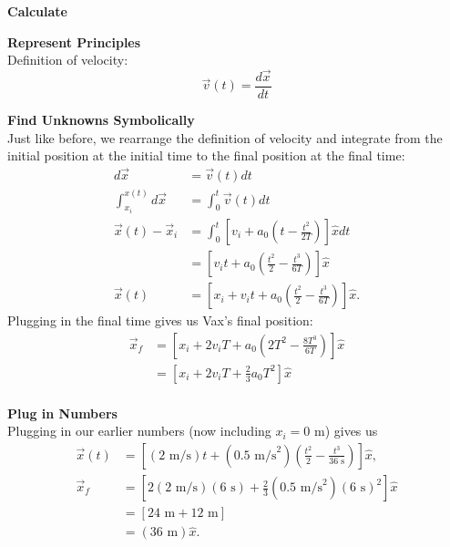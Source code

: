 \documentclass[]{article}
\begin{document}
\newpage
\begin{TeacherMargin}
\noindent\textbf{Calculate}

\noindent\textbf{Represent Principles} \\
Definition of velocity:
\[
\vec{v}(t) = \frac{d\vec{x}}{dt}
\]

\noindent\textbf{Find Unknowns Symbolically} \\
Just like before, we rearrange the definition of velocity and integrate from the initial position at the initial time to the final position at the final time:
\[
\begin{split}
	d\vec{x} & = \vec{v}(t) dt \\
	\int_{x_{i}}^{x(t)}d\vec{x} & = \int_{0}^{t}\vec{v}(t) dt \\
	\vec{x}(t) - \vec{x}_{i} & = \int_{0}^{t}\left[v_{i} + a_{0}\left(t-\frac{t^{2}}{2T}\right)\right]\hat{x} dt \\
	& = \left[v_{i}t + a_{0}\left(\frac{t^{2}}{2}-\frac{t^{3}}{6T}\right)\right]\hat{x} \\
	\vec{x}(t) & = \left[x_{i} + v_{i}t + a_{0}\left(\frac{t^{2}}{2}-\frac{t^{3}}{6T}\right)\right]\hat{x}.
\end{split}
\]
Plugging in the final time gives us Vax's final position:
\[
\begin{split}
	\vec{x}_{f} & = \left[x_{i} + 2v_{i}T + a_{0}\left(2T^{2}-\frac{8T^{3}}{6T}\right)\right]\hat{x} \\
	& = \left[x_{i} + 2v_{i}T + \frac{2}{3}a_{0}T^{2}\right]\hat{x} \\
\end{split}
\]

\noindent\textbf{Plug in Numbers} \\
Plugging in our earlier numbers (now including $x_{i} = 0$ m) gives us
\[
\begin{split}
	\vec{x}(t) & = \left[(2\text{ m/s})t + (0.5\text{ m/s}^{2})\left(\frac{t^{2}}{2}-\frac{t^{3}}{36\text{ s}}\right)\right]\hat{x}, \\
	\vec{x}_{f} & = \left[2(2\text{ m/s})(6\text{ s}) + \frac{2}{3}(0.5\text{ m/s}^{2})(6\text{ s})^{2}\right]\hat{x} \\
	& = \left[24\text{ m} + 12\text{ m}\right] \\
	& = (36\text{ m})\hat{x}.
\end{split}
\]

\end{TeacherMargin}
\end{document}
